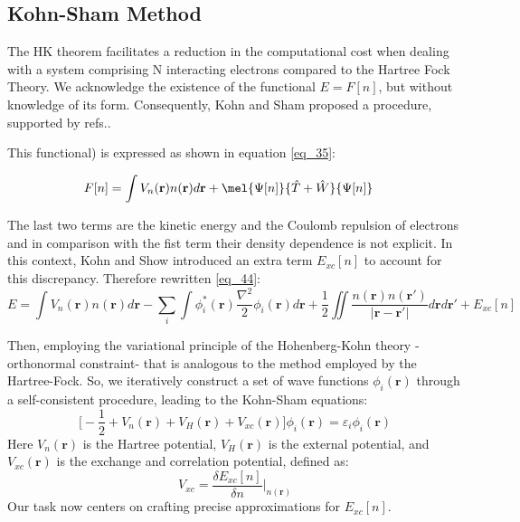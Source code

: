 \subsection{Kohn-Sham Method}
\label{subsection.Kohn_Sham}
The HK theorem facilitates a reduction in the computational cost when dealing with a system comprising N interacting electrons compared to the Hartree Fock Theory. We acknowledge the existence of the functional  $ E = F[n]$, but without knowledge of its form. Consequently, Kohn and Sham proposed a procedure, supported by refs.\supercite{Giustino2014,Scheffler2017,Lee2011}.

This functional) is expressed  as shown in equation \ref{eq_35}:

\begin{equation} \label{eq_44}
\begin{aligned}
	    F[n]&=\int V_n (\mathbf{r})n(\mathbf{r})d \mathbf{r}+\mel{\Psi[n]}{\hat{T}+\hat{W}}{\Psi[n]} 
\end{aligned}
\end{equation}

The last two terms are the kinetic energy and the Coulomb repulsion of electrons and in comparison with the fist term their density dependence is not explicit. In this context, Kohn and Show\supercite{Kohn1965} introduced an extra term $E_{xc}[n]$  to account for this discrepancy. Therefore rewritten \ref{eq_44}:
\begin{equation} \label{eq_45}
	E=\int V_n (\mathbf{r})n(\mathbf{r})d \mathbf{r}-\sum_{i} \int  \phi_{i}^{*}(\mathbf{r})\dfrac{\nabla^{2}}{2} \phi_{i}(\mathbf{r})d \mathbf{r} + \dfrac{1}{2} \iint \dfrac{n(\mathbf{r})n(\mathbf{r'})}{|\mathbf{r}-\mathbf{r'}|} d \mathbf{r} d \mathbf{r}' +E_{xc}[n]
\end{equation}

Then, employing the variational principle of the Hohenberg-Kohn theory -orthonormal constraint- that is analogous to the method employed by the Hartree-Fock. So, we iteratively construct a set of wave functions $\phi_i(\mathbf{r})$ through a self-consistent procedure, leading to the Kohn-Sham equations:
\begin{equation} \label{eq_46}
	\Biggl[-\dfrac{1}{2}+ V_n(\mathbf{r})+ V_H(\mathbf{r})+V_{xc}(\mathbf{r}) \Biggr]\phi_i(\mathbf{r})= \varepsilon_i \phi_i (\mathbf{r})
\end{equation}
Here $V_n(\mathbf{r})$ is the Hartree potential, $V_H (\mathbf{r})$  is the external potential, and $V_{xc}(\mathbf{r})$ is the exchange and correlation potential, defined as:
\begin{equation} \label{eq_47}
	V_{xc} = \dfrac{\delta E_{xc}[n]}{\delta n} \Biggr|_{n(\mathbf{r
		})}
\end{equation}
Our task now centers on crafting precise approximations for $E_{xc}[n]$.
